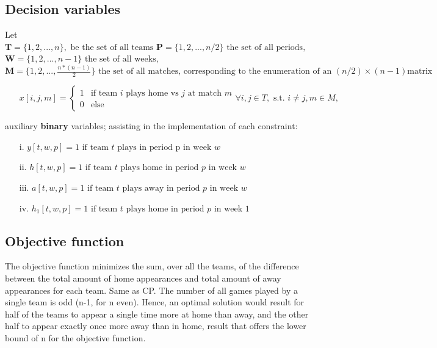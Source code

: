 \documentclass{article}
\begin{document}
\subsection{Decision variables}
Let $\mathbf{T}=\{1,2,...,n\} , \text{ be the set of all teams } \mathbf{P}=\{1,2,...,n/2\} \text{ the set of all periods, } $\\
$\mathbf{W}=\{1,2,...,n-1\}  \text{ the set of all weeks, }$\\ 
$\mathbf{M}=\{1,2,...,\frac{n*(n-1)}{2}\} \text{ the set of all matches, corresponding to the enumeration of an } (n/2)\times(n-1)\text{matrix}$
\begin{itemize}
    \item[] $ x[i,j,m] = \left\{
	\begin{array}{ll}
		 \scriptstyle 1 & \scriptstyle \text{if team $i$ plays home vs $j$ at match $m$} \\
         \scriptstyle 0 & \scriptstyle \text{else} 
	\end{array}
\right. \forall i,j \in T, \text{ s.t. } i\neq j, m \in M, $\\
\end{itemize}
auxiliary \textbf{binary} variables; assisting in the implementation of each constraint:
\begin{enumerate}
    \item [i.] $y[t,w,p]= 1  \text{ if team $t$ plays in period p in week $w$}$
 \item[ii.]    $h[t,w,p]= 
		 1  \text{ if team $t$ plays home in period $p$ in week $w$}$
\item[iii.] $a[t,w,p]=
		 1  \text{ if team $t$ plays away in period $p$ in week $w$} $
\item[iv.] $h_1[t,w,p]=
		 1  \text{ if team $t$ plays home in period $p$ in week 1} $


\end{enumerate}



\subsection{Objective function}
The objective function minimizes the sum, over all the teams, of the difference between the total amount of home appearances and total amount of away appearances for each team. Same as CP.
The number of all games played by a single team is odd (n-1, for n even). Hence, an optimal solution would result for half of the teams to appear a single time more at home than away, and the other half to appear exactly once more away than in home, result that offers the lower bound of n for the objective function. 
\end{document}

